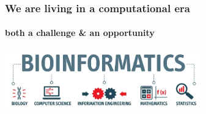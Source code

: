 \documentclass{beamer}
\begin{document}
   \begin{frame}

      \frametitle{We are living in a computational era}
      \framesubtitle{both a challenge \& an opportunity}
      \centering
      \includegraphics[width=85mm]{resources/bioinfo_transparent.png}

   \end{frame}




   

      





\end{document}
